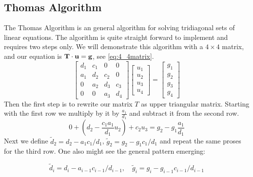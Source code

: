 \subsection*{Thomas Algorithm}

The Thomas Algorithm is an general algorithm for solving tridiagonal sets of
linear equations. The algorithm is quite straight forward to implement and 
requires two steps only.
We will demonstrate this algorithm with a $4 \times 4$ matrix, and 
our equation is $\mathbf{T} \cdot \mathbf{u} = \mathbf{g}$, see \cref{eq:4_4matrix}.
\begin{equation}\label{eq:4_4matrix}
  \begin{bmatrix}
    d_1 & c_1 & 0 & 0 \\
    a_1 & d_2 & c_2 & 0 \\
    0 & a_2 & d_3 & c_3  \\
    0 & 0 & a_3 & d_4 
  \end{bmatrix} \begin{bmatrix}
    u_1 \\ u_2 \\ u_3 \\ u_4
  \end{bmatrix} = \begin{bmatrix}
    g_1 \\ g_2 \\ g_3 \\ g_4
  \end{bmatrix}
\end{equation} 
Then the first step is to rewrite our matrix $T$ as upper triangular matrix.
Starting with the first row we multiply by it by $\frac{a_1}{d_1}$ and subtract
it from the second row.
\begin{equation*}
  0 + \left(d_2 - \frac{c_1 a_1}{d_1}u_2 \right)+ c_2u_3 = g_2 -g_1 
  \frac{a_1}{d_1}  
\end{equation*}  
Next we define $\tilde{d}_2 = d_2 - a_1 c_1/d_1$, 
$\tilde{g}_2 =  g_2 - g_1 c_1/d_1$ and repeat the same proses for the third row.
One also might see the general pattern emerging:

\begin{equation}
  \tilde{d}_i = d_i- a_{i-1} c_{i-1}/d_{i-1}, \quad \tilde{g}_i =  g_i - g_{i-1} c_{i-1}/d_{i-1}
\end{equation}

